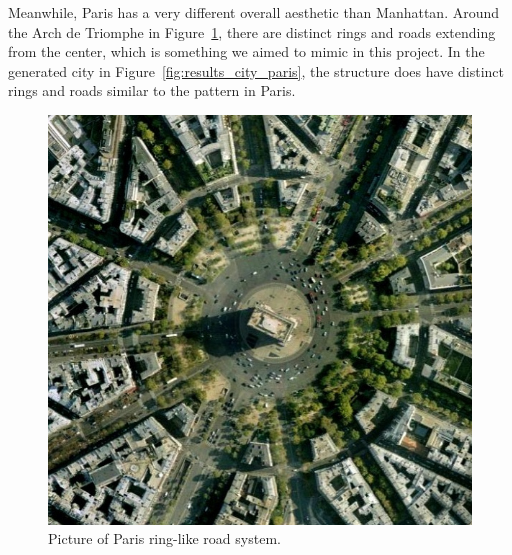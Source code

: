 Meanwhile, Paris has a very different overall aesthetic than Manhattan.
Around the Arch de Triomphe in Figure~\ref{fig:results_real_city_paris}, there are distinct rings and roads extending from the center, which is something we aimed to mimic in this project.
In the generated city in Figure~\ref{fig:results_city_paris}, the structure does have distinct rings and roads similar to the pattern in Paris. 

\begin{figure}[H]
  \centering
  \begin{minipage}{.45\textwidth}
    \centering
    \begin{minipage}{.9\textwidth}
      \centering
      \includegraphics[width=\textwidth]{figure/results/paris_arc_de_triomphe.jpg}
      \caption{Picture of Paris ring-like road system.}
      \label{fig:results_real_city_paris}
    \end{minipage}
  \end{minipage}
  \begin{minipage}{.45\textwidth}
    \begin{minipage}{.9\textwidth}
      \centering
      \centering

\end{minipage}
\end{minipage}
\end{figure}
